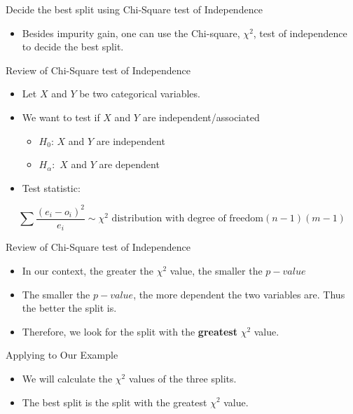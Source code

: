 \documentclass[
  ignorenonframetext,
]{beamer}
\providecommand{\tightlist}{%
  \setlength{\itemsep}{0pt}\setlength{\parskip}{0pt}}\usepackage{longtable,booktabs,array}
\begin{document}
\begin{frame}{Decide the best split using Chi-Square test of
Independence}
\label{decide-the-best-split-using-chi-square-test-of-independence}
\begin{itemize}
\tightlist
\item
  Besides impurity gain, one can use the Chi-square, \(\chi^2\), test of
  independence to decide the best split.
\end{itemize}
\end{frame}

\begin{frame}{Review of Chi-Square test of Independence}
\label{review-of-chi-square-test-of-independence}
\begin{itemize}
\tightlist
\item
  Let \(X\) and \(Y\) be two categorical variables.
\item
  We want to test if \(X\) and \(Y\) are independent/associated

  \begin{itemize}
  \tightlist
  \item
    \(H_0\): \(X\) and \(Y\) are independent
  \item
    \(H_{\alpha}:\) \(X\) and \(Y\) are dependent
  \end{itemize}
\item
  Test statistic:
\end{itemize}

\[\sum\frac{(e_i-o_i)^2}{e_i} \sim \chi^2 \text{ distribution with degree of freedom} (n-1)(m-1)\]
\end{frame}

\begin{frame}{Review of Chi-Square test of Independence}
\label{review-of-chi-square-test-of-independence-1}
\begin{itemize}
\tightlist
\item
  In our context, the greater the \(\chi^2\) value, the smaller the
  \(p-value\)
\item
  The smaller the \(p-value\), the more dependent the two variables are.
  Thus the better the split is.
\item
  Therefore, we look for the split with the \textbf{greatest} \(\chi^2\)
  value.
\end{itemize}
\end{frame}

\begin{frame}{Applying to Our Example}
\label{applying-to-our-example}
\begin{itemize}
\tightlist
\item
  We will calculate the \(\chi^2\) values of the three splits.\\
\item
  The best split is the split with the greatest \(\chi^2\) value.
\end{itemize}
\end{frame}
\end{document}
